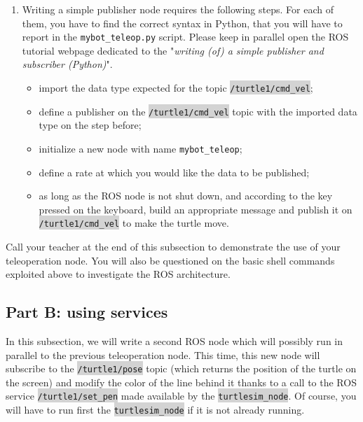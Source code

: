 \documentclass[10pt,a4paper,printanswers]{upmc}
\newcounter{mainmemorder}
\newcommand{\load}{\setcounter{enumi}{\value{mainmemorder}}}
\newcommand{\mytext}[1]{\colorbox{lightgray}{\texttt{#1}}}
\newcommand{\subsecline}{\texorpdfstring{\hrulefill}{}}
\begin{document}
\begin{enumerate}
  \load
  \item Writing a simple publisher node requires the following steps. For each of them, you have to
        find the correct syntax in Python, that you will have to report in the
        \texttt{mybot\_teleop.py} script. Please keep in parallel open the ROS tutorial webpage
        dedicated to the "\textit{writing (of) a simple publisher and subscriber (Python)}".
        \begin{itemize}
          \item import the data type expected for the topic \mytext{/turtle1/cmd\_vel};
          \item define a publisher on the \mytext{/turtle1/cmd\_vel} topic with the imported data
                type on the step before;
          \item initialize a new node with name \texttt{mybot\_teleop};
          \item define a rate at which you would like the data to be published;
          \item as long as the ROS node is not shut down, and according to the key pressed on the
                keyboard, build an appropriate message and publish it on \mytext{/turtle1/cmd\_vel}
                to make the turtle move.
        \end{itemize}
\end{enumerate}


\begin{mdframed}[style=evaluation]
  Call your teacher at the end of this subsection to demonstrate the use of your
  teleoperation node. You will also be questioned on the basic shell commands exploited above to
  investigate the ROS architecture.
\end{mdframed}

\subsection{Part B: using services \subsecline}

In this subsection, we will write a second ROS node which will possibly run in parallel to the
previous teleoperation node. This time, this new node will subscribe to the \mytext{/turtle1/pose}
topic (which returns the position of the turtle on the screen) and modify the color of the line
behind it thanks to a call to the ROS service \mytext{/turtle1/set\_pen} made available by the
\mytext{turtlesim\_node}. Of course, you will have to run first the \mytext{turtlesim\_node} if it
is not already running.
\end{document}
